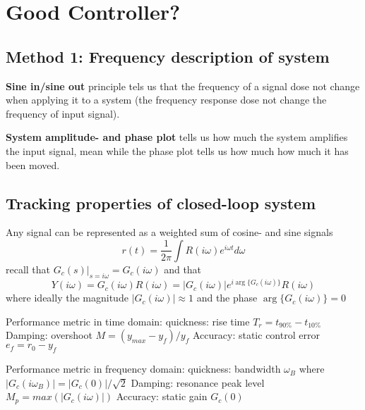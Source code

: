 
\section{Good Controller?}
\subsection{Method 1: Frequency description of system}
\textbf{Sine in/sine out} principle tels us that the frequency of a signal dose not 
change when applying it to a system (the frequency response dose not change the 
frequency of input signal).

\textbf{System amplitude- and phase plot} tells us how much the system amplifies the 
input signal, mean while the phase plot tells us how much how much it has been moved.

\subsection{Tracking properties of closed-loop system}
Any signal can be represented as a weighted sum of cosine- and sine signals
\begin{equation*}
    r(t) = \frac{1}{2\pi} \int R(i\omega)e^{i\omega t}d\omega
\end{equation*}
recall that $G_c(s)|_{s=i\omega} = G_c(i\omega)$ and that
\begin{equation*}
    Y(i\omega) = G_c(i\omega)R(i\omega) = |G_c(i\omega)|e^{i \arg\{G_c(i\omega)\}}R(i\omega)
\end{equation*}
where ideally the magnitude $|G_c(i\omega)| \approx 1$ and the phase $\arg\{ G_c(i\omega) \} = 0$

Performance metric in time domain:
quickness: rise time $T_r = t_{90\%} - t_{10\%}$
Damping: overshoot $M = (y_{max}- y_f)/y_f$
Accuracy: static control error $e_f = r_0 - y_f$

Performance metric in frequency domain:
quickness: bandwidth $\omega_B$ where $|G_c(i\omega_B)| = |G_c(0)|/\sqrt{2}$
Damping: resonance peak level $M_p = max(|G_c(i\omega)|)$
Accuracy: static gain $G_c(0)$


